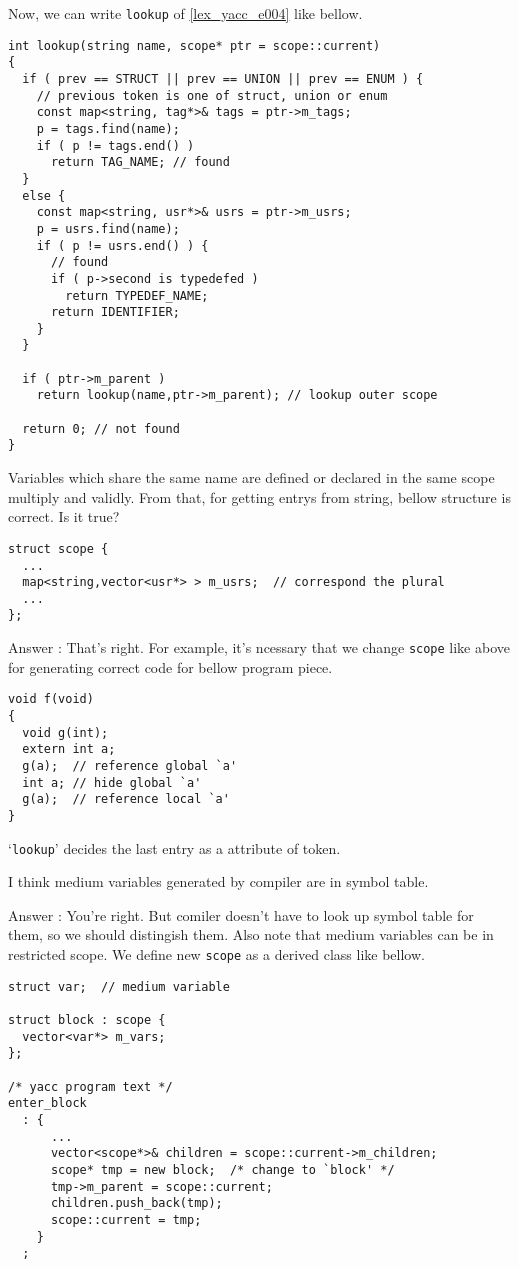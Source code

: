 Now, we can write  {\tt{lookup}} of \ref{lex_yacc_e004} like bellow.
\begin{verbatim}
int lookup(string name, scope* ptr = scope::current)
{
  if ( prev == STRUCT || prev == UNION || prev == ENUM ) {
    // previous token is one of struct, union or enum
    const map<string, tag*>& tags = ptr->m_tags;
    p = tags.find(name);
    if ( p != tags.end() )
      return TAG_NAME; // found
  }
  else {
    const map<string, usr*>& usrs = ptr->m_usrs;
    p = usrs.find(name);
    if ( p != usrs.end() ) {
      // found
      if ( p->second is typedefed )
        return TYPEDEF_NAME;
      return IDENTIFIER;
    }
  }

  if ( ptr->m_parent )
    return lookup(name,ptr->m_parent); // lookup outer scope

  return 0; // not found
}
\end{verbatim}

\begin{QandA}
Variables which share the same name are defined or declared
in the same scope multiply and validly. From that, for getting
entrys from string, bellow structure is correct. Is it true?
\begin{verbatim}
struct scope {
  ...
  map<string,vector<usr*> > m_usrs;  // correspond the plural
  ...
};
\end{verbatim}

Answer : That's right. For example, it's ncessary that
we change {\tt {scope}} like above for generating correct
code for bellow program piece.
\begin{verbatim}
void f(void)
{
  void g(int);
  extern int a;
  g(a);  // reference global `a'
  int a; // hide global `a'
  g(a);  // reference local `a'
}
\end{verbatim}
`{\tt{lookup}}' decides the last entry as a attribute of token.
\end{QandA}

\begin{QandA}
I think medium variables generated by compiler are in symbol table.

Answer : You're right. But comiler doesn't have to look up symbol table
for them, so we should distingish them. Also note that medium variables
can be in restricted scope. We define new {\tt{scope}} as a derived
class like bellow.
\begin{verbatim}
struct var;  // medium variable

struct block : scope {
  vector<var*> m_vars;
};

/* yacc program text */
enter_block
  : {
      ...
      vector<scope*>& children = scope::current->m_children;
      scope* tmp = new block;  /* change to `block' */
      tmp->m_parent = scope::current;
      children.push_back(tmp);
      scope::current = tmp;
    }
  ;
\end{verbatim}
\end{QandA}

